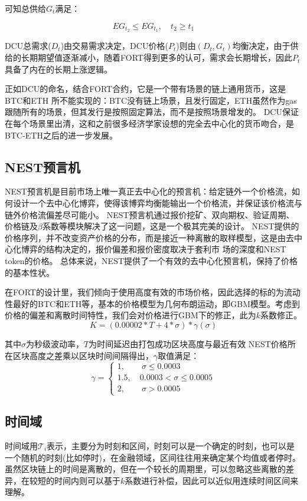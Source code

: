 \documentclass[letterpaper,11pt]{ctexart}
\begin{document}
可知总供给$G_t$满足：

\begin{equation} 
EG_{t_2} \leq EG_{t_1}, \quad t_2 \geq t_1 
\end{equation}

DCU总需求($D_t$)由交易需求决定，DCU价格($P_t$)则由$(D_t, G_t)$均衡决定，由于供给的长期期望值逐渐减小，随着FORT得到更多的认可，需求会长期增长，因此$P_t$具备了内在的长期上涨逻辑。

正如DCU的命名，结合FORT合约，它是一个带有场景的链上通用货币，这是BTC和ETH 所不能实现的：BTC没有链上场景，且发行固定，ETH虽然作为gas跟随所有的场景，但其发行是按照固定算法，而不是按照场景增发的。
DCU保证在每个场景里出清，这和之前很多经济学家设想的完全去中心化的货币吻合，是BTC-ETH之后的进一步发展。

\subsection{NEST预言机}
NEST预言机是目前市场上唯一真正去中心化的预言机：给定链外一个价格流，如何设计一个去中心化博弈，使得该博弈均衡能输出一个价格流，并保证该价格流与链外价格流偏差尽可能小。
NEST预言机通过报价挖矿、双向期权、验证周期、价格链及$\beta$系数等模块解决了这一问题，这是一个极其完美的设计。
NEST提供的价格序列，并不改变资产价格的分布，而是接近一种离散的取样模型，这是由去中心化博弈的结构决定的，报价偏差和报价密度取决于套利市 场的深度和NEST token的价格。
总体来说，NEST提供了一个有效的去中心化预言机，保持了价格的基本性状。

在FORT的设计里，我们倾向于使用高度有效的市场价格，因此选择的标的为流动性最好的BTC和ETH等，基本的价格模型为几何布朗运动，即GBM模型。考虑到价格的偏差和离散时间特性，我们会对价格进行GBM下的修正，此为$k$系数修正。
\begin{equation} 
K =(0.00002 * T + 4 * \sigma) * \gamma(\sigma)
\end{equation}

其中$\sigma$为秒级波动率，$T$为时间延迟由打包成功区块高度与最近有效 NEST价格所在区块高度之差乘以区块时间间隔得出，$\gamma$取值满足：
\begin{equation} 
\gamma =\begin{cases}1,\qquad \sigma \leq 0.0003\\
1.5,\quad 0.0003 <\sigma \leq 0.0005\\
2,\qquad \sigma  >0.0005\end{cases}
\end{equation}

\subsection{时间域}
时间域用$\mathcal{T}_i$表示，主要分为时刻和区间，时刻可以是一个确定的时刻，也可以是一个随机的时刻(比如停时)，在金融领域，区间往往用来确定某个均值或者停时。
虽然区块链上的时间是离散的，但在一个较长的周期里，可以忽略这些离散的差异，在较短的时间内则可以基于$k$系数进行补偿，因此可以近似用连续时间区间来理解。
\end{document}
